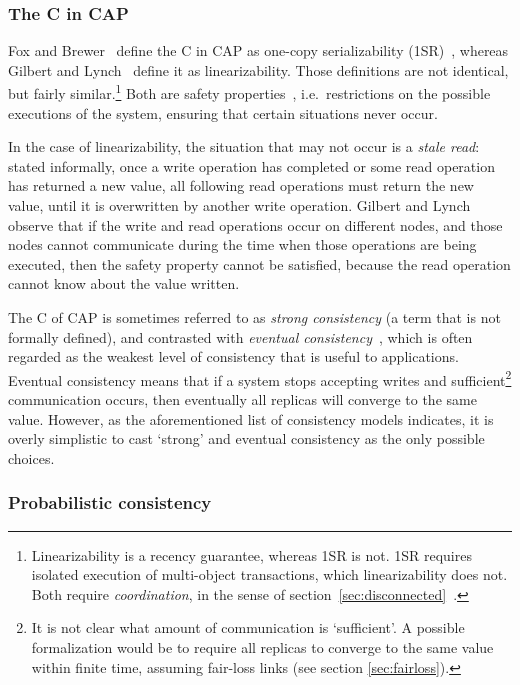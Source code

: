 \documentclass[a4paper,twocolumn,10pt]{article}
\begin{document}
\subsubsection{The C in CAP}\label{sec:c-in-cap}

Fox and Brewer~\cite{Fox1999bs} define the C in CAP as one-copy serializability
(1SR)~\cite{Bernstein1987va}, whereas Gilbert and Lynch~\cite{Gilbert2002il} define it as
linearizability. Those definitions are not identical, but fairly similar.\footnote{Linearizability
is a recency guarantee, whereas 1SR is not. 1SR requires isolated execution of multi-object
transactions, which linearizability does not. Both require \emph{coordination}, in the sense of
section~\ref{sec:disconnected}~\cite{Bailis2014vc}.} Both are safety properties~\cite{Alpern1985dg},
i.e.\ restrictions on the possible executions of the system, ensuring that certain situations never
occur.

In the case of linearizability, the situation that may not occur is a \emph{stale read}: stated
informally, once a write operation has completed or some read operation has returned a new value,
all following read operations must return the new value, until it is overwritten by another write
operation. Gilbert and Lynch observe that if the write and read operations occur on different nodes,
and those nodes cannot communicate during the time when those operations are being executed, then
the safety property cannot be satisfied, because the read operation cannot know about the value
written.

The C of CAP is sometimes referred to as \emph{strong consistency} (a term that is not formally
defined), and contrasted with \emph{eventual consistency}~\cite{Terry1994fp, Vogels2008ey, Bailis2013jc},
which is often regarded as the weakest level of consistency that is useful to applications. Eventual
consistency means that if a system stops accepting writes and sufficient\footnote{It is not clear
what amount of communication is `sufficient'. A possible formalization would be to require all
replicas to converge to the same value within finite time, assuming fair-loss links (see section
\ref{sec:fairloss}).} communication occurs, then eventually all replicas will converge to the same
value. However, as the aforementioned list of consistency models indicates, it is overly simplistic
to cast `strong' and eventual consistency as the only possible choices.

\subsubsection{Probabilistic consistency}
\end{document}
